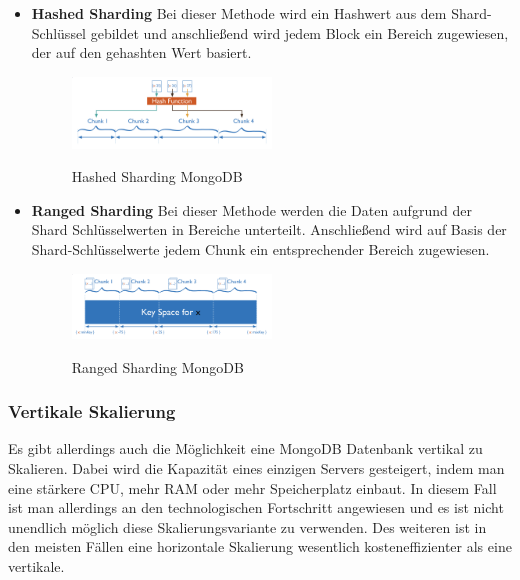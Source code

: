 \begin{itemize}
    \item \textbf{Hashed Sharding}
        \newline
        Bei dieser Methode wird ein Hashwert aus dem Shard-Schlüssel gebildet und anschließend wird jedem Block ein Bereich zugewiesen, der auf den gehashten Wert basiert.
        \begin{figure}[h!]
            \centering
            \includegraphics[width=0.5\textwidth]{pics/hashed_sharding.png}
            \caption{Hashed Sharding MongoDB}
            \cite{hashed_sharding_image}
            \label{fig:enter-label}
        \end{figure}
    \item \textbf{Ranged Sharding}
        \newline
        Bei dieser Methode werden die Daten aufgrund der Shard Schlüsselwerten in Bereiche unterteilt. Anschließend wird auf Basis der Shard-Schlüsselwerte  jedem Chunk ein entsprechender Bereich zugewiesen.
        \begin{figure}[h!]
            \centering
            \includegraphics[width=0.5\textwidth]{pics/ranged_sharding.png}
            \caption{Ranged Sharding MongoDB}
            \cite{range_sharding_image}
            \label{fig:enter-label}
        \end{figure}
\end{itemize}

\subsubsection{Vertikale Skalierung}
Es gibt allerdings auch die Möglichkeit eine MongoDB Datenbank vertikal zu Skalieren. Dabei wird die Kapazität eines einzigen Servers gesteigert, indem man eine stärkere CPU, mehr RAM oder mehr Speicherplatz einbaut. In diesem Fall ist man allerdings an den technologischen Fortschritt angewiesen und es ist nicht unendlich möglich diese Skalierungsvariante zu verwenden. Des weiteren ist in den meisten Fällen eine horizontale Skalierung wesentlich kosteneffizienter als eine vertikale.
\cite{mongodb_sharding}

